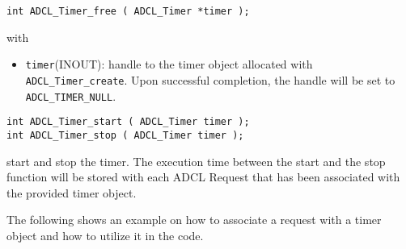 \begin{verbatim}
int ADCL_Timer_free ( ADCL_Timer *timer );
\end{verbatim}
with
\begin{itemize}
\item {\tt timer}(INOUT): handle to the timer object allocated with {\tt
  ADCL\_Timer\-\_create}.  Upon successful completion, the handle will be set
  to {\tt ADCL\_TIMER\_NULL}.
\end{itemize}


\begin{verbatim}
int ADCL_Timer_start ( ADCL_Timer timer );
int ADCL_Timer_stop ( ADCL_Timer timer );
\end{verbatim}
start and stop the timer. The execution time between the start and the stop
function will be stored with each ADCL Request that has been associated with
the provided timer object.


The following shows an example on how to associate a request with a timer
object and how to utilize it in the code.

